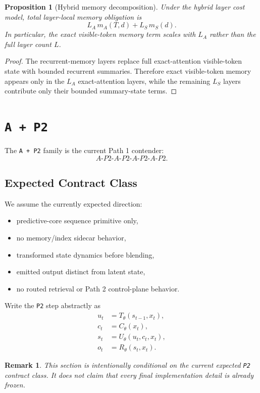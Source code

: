 \documentclass[11pt]{article}
\newtheorem{proposition}[definition]{Proposition}
\newtheorem{remark}[definition]{Remark}
\begin{document}
\begin{proposition}[Hybrid memory decomposition]
Under the hybrid layer cost model, total layer-local memory obligation is
\[
  L_A \, m_A(T, d) + L_S \, m_S(d).
\]
In particular, the exact visible-token memory term scales with $L_A$ rather
than the full layer count $L$.
\end{proposition}

\begin{proof}
The recurrent-memory layers replace full exact-attention visible-token state
with bounded recurrent summaries. Therefore exact visible-token memory appears
only in the $L_A$ exact-attention layers, while the remaining $L_S$ layers
contribute only their bounded summary-state terms.
\end{proof}

\section{\texttt{A + P2}}

The \texttt{A + P2} family is the current Path 1 contender:
\[
  A\text{-}P2\text{-}A\text{-}P2\text{-}A\text{-}P2\text{-}A\text{-}P2.
\]

\subsection{Expected Contract Class}

We assume the currently expected direction:
\begin{itemize}
  \item predictive-core sequence primitive only,
  \item no memory/index sidecar behavior,
  \item transformed state dynamics before blending,
  \item emitted output distinct from latent state,
  \item no routed retrieval or Path 2 control-plane behavior.
\end{itemize}

Write the \texttt{P2} step abstractly as
\begin{align}
  u_t &= T_\theta(s_{t-1}, x_t), \\
  c_t &= C_\theta(x_t), \\
  s_t &= U_\theta(u_t, c_t, x_t), \\
  o_t &= R_\theta(s_t, x_t).
\end{align}

\begin{remark}
This section is intentionally conditional on the current expected \texttt{P2}
contract class. It does not claim that every final implementation detail is
already frozen.
\end{remark}
\end{document}
